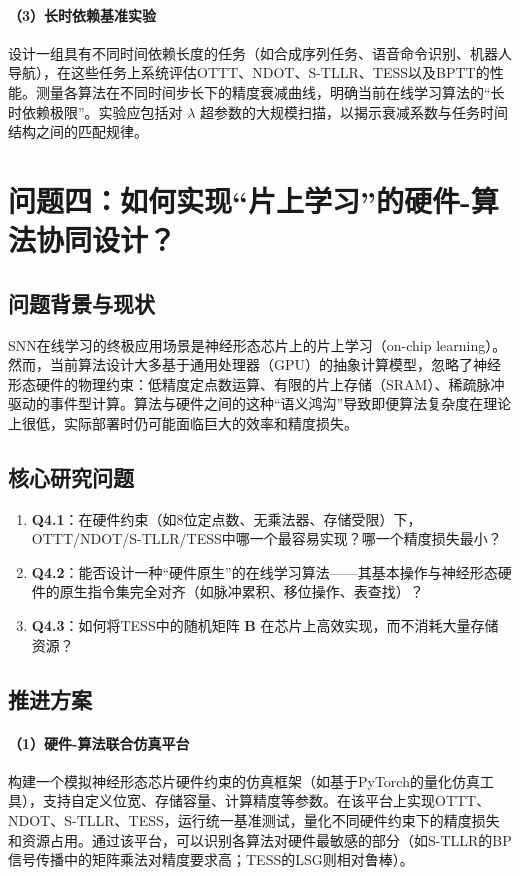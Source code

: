 \documentclass{article}
\begin{document}
\paragraph{（3）长时依赖基准实验}
设计一组具有不同时间依赖长度的任务（如合成序列任务、语音命令识别、机器人导航），在这些任务上系统评估OTTT、NDOT、S-TLLR、TESS以及BPTT的性能。测量各算法在不同时间步长下的精度衰减曲线，明确当前在线学习算法的“长时依赖极限”。实验应包括对 \(\lambda\) 超参数的大规模扫描，以揭示衰减系数与任务时间结构之间的匹配规律。

\section{问题四：如何实现“片上学习”的硬件-算法协同设计？}

\subsection{问题背景与现状}

SNN在线学习的终极应用场景是神经形态芯片上的片上学习（on-chip learning）。然而，当前算法设计大多基于通用处理器（GPU）的抽象计算模型，忽略了神经形态硬件的物理约束：低精度定点数运算、有限的片上存储（SRAM）、稀疏脉冲驱动的事件型计算。算法与硬件之间的这种“语义鸿沟”导致即便算法复杂度在理论上很低，实际部署时仍可能面临巨大的效率和精度损失。

\subsection{核心研究问题}

\begin{enumerate}
    \item \textbf{Q4.1}：在硬件约束（如8位定点数、无乘法器、存储受限）下，OTTT/NDOT/S-TLLR/TESS中哪一个最容易实现？哪一个精度损失最小？
    \item \textbf{Q4.2}：能否设计一种“硬件原生”的在线学习算法——其基本操作与神经形态硬件的原生指令集完全对齐（如脉冲累积、移位操作、表查找）？
    \item \textbf{Q4.3}：如何将TESS中的随机矩阵 \(\mathbf{B}\) 在芯片上高效实现，而不消耗大量存储资源？
\end{enumerate}

\subsection{推进方案}

\paragraph{（1）硬件-算法联合仿真平台}
构建一个模拟神经形态芯片硬件约束的仿真框架（如基于PyTorch的量化仿真工具），支持自定义位宽、存储容量、计算精度等参数。在该平台上实现OTTT、NDOT、S-TLLR、TESS，运行统一基准测试，量化不同硬件约束下的精度损失和资源占用。通过该平台，可以识别各算法对硬件最敏感的部分（如S-TLLR的BP信号传播中的矩阵乘法对精度要求高；TESS的LSG则相对鲁棒）。
\end{document}
